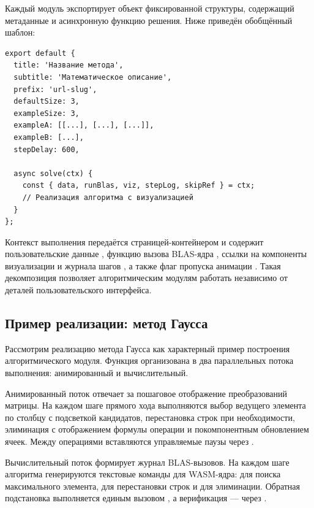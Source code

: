 \documentclass[12pt, oneside]{book}
\begin{document}
    \quad Каждый модуль экспортирует объект фиксированной структуры, содержащий метаданные и асинхронную функцию решения. Ниже приведён обобщённый шаблон:

\begin{verbatim}
export default {
  title: 'Название метода',
  subtitle: 'Математическое описание',
  prefix: 'url-slug',
  defaultSize: 3,
  exampleSize: 3,
  exampleA: [[...], [...], [...]],
  exampleB: [...],
  stepDelay: 600,

  async solve(ctx) {
    const { data, runBlas, viz, stepLog, skipRef } = ctx;
    // Реализация алгоритма с визуализацией
  }
};
\end{verbatim}

    \quad Контекст выполнения \texttt{} передаётся страницей-контейнером и содержит пользовательские данные \texttt{}, функцию вызова BLAS-ядра \texttt{}, ссылки на компоненты визуализации \texttt{} и журнала шагов \texttt{}, а также флаг пропуска анимации \texttt{}. Такая декомпозиция позволяет алгоритмическим модулям работать независимо от деталей пользовательского интерфейса.

\subsection{Пример реализации: метод Гаусса}

    \quad Рассмотрим реализацию метода Гаусса как характерный пример построения алгоритмического модуля. Функция \texttt{} организована в два параллельных потока выполнения: анимированный и вычислительный.

    \quad Анимированный поток отвечает за пошаговое отображение преобразований матрицы. На каждом шаге прямого хода выполняются выбор ведущего элемента по столбцу с подсветкой кандидатов, перестановка строк при необходимости, элиминация с отображением формулы операции и покомпонентным обновлением ячеек. Между операциями вставляются управляемые паузы через \texttt{}.

    \quad Вычислительный поток формирует журнал BLAS-вызовов. На каждом шаге алгоритма генерируются текстовые команды для WASM-ядра: \texttt{} для поиска максимального элемента, \texttt{} для перестановки строк и \texttt{} для элиминации. Обратная подстановка выполняется единым вызовом \texttt{}, а верификация --- через \texttt{}.
\end{document}
